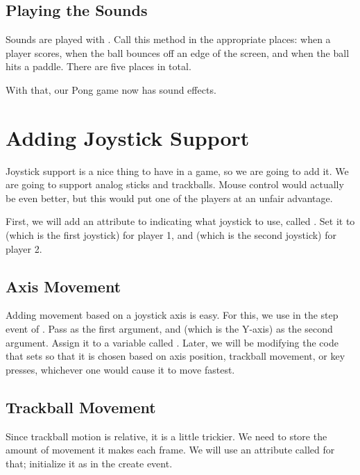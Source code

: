 \documentclass[letterpaper,10pt,english]{sphinxmanual}
\begin{document}
\subsection{Playing the Sounds}
\label{pong_better:playing-the-sounds}
Sounds are played with {\hyperref[snd:sge.snd.Sound.play]{\emph{}}}.  Call this method in
the appropriate places: when a player scores, when the ball bounces off
an edge of the screen, and when the ball hits a paddle.  There are five
places in total.

With that, our Pong game now has sound effects.


\section{Adding Joystick Support}
\label{pong_better:adding-joystick-support}
Joystick support is a nice thing to have in a game, so we are going to
add it.  We are going to support analog sticks and trackballs.  Mouse
control would actually be even better, but this would put one of the
players at an unfair advantage.

First, we will add an attribute to  indicating what
joystick to use, called .  Set it to  (which is the
first joystick) for player 1, and  (which is the second joystick)
for player 2.


\subsection{Axis Movement}
\label{pong_better:axis-movement}
Adding movement based on a joystick axis is easy.  For this, we use
{\hyperref[joystick:sge.joystick.get_axis]{\emph{}}} in the step event of .
Pass  as the first argument, and  (which is the
Y-axis) as the second argument.  Assign it to a variable called
.  Later, we will be modifying the code that sets
 so that it is chosen based on axis position, trackball
movement, or key presses, whichever one would cause it to move fastest.


\subsection{Trackball Movement}
\label{pong_better:trackball-movement}
Since trackball motion is relative, it is a little trickier.  We need to
store the amount of movement it makes each frame.  We will use an
attribute called  for that; initialize it as
 in the create event.
\end{document}

